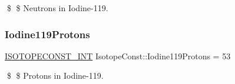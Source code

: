 \$ \$ Neutrons in Iodine-\/119. \mbox{\label{group___isotope_const-_iodine-_i119_ga5a9695aca449a5242ec4214de4b8b096}} 
\subsubsection{\texorpdfstring{Iodine119\+Protons}{Iodine119Protons}}
{\footnotesize\ttfamily \mbox{\hyperlink{group___isotope_const-_macros_ga5f18360b3e99483a35c32d789e62621c}{I\+S\+O\+T\+O\+P\+E\+C\+O\+N\+S\+T\+\_\+\+I\+NT}} Isotope\+Const\+::\+Iodine119\+Protons = 53}

\$ \$ Protons in Iodine-\/119. 
